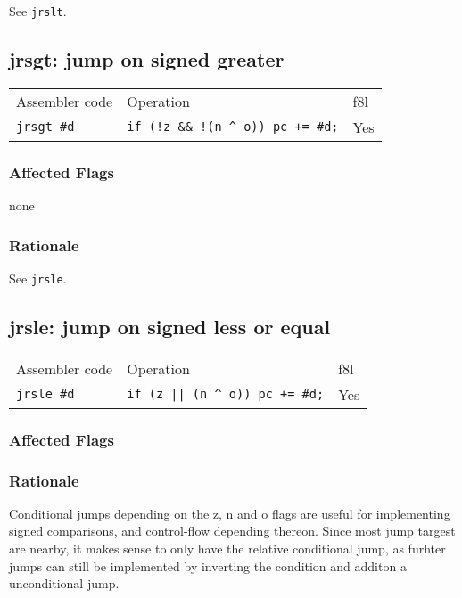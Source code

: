 \documentclass{book}
\begin{document}
See \texttt{jrslt}.


\subsection{jrsgt: jump on signed greater}

\begin{tabular}{l l l}
Assembler code     & Operation                                    & f8l \\
\texttt{jrsgt \#d} & \texttt{if (!z \&\& !(n \^{} o)) pc += \#d;} & Yes \\
\end{tabular}

\subsubsection*{Affected Flags}

none

\subsubsection*{Rationale}

See \texttt{jrsle}.


\subsection{jrsle: jump on signed less or equal}

\begin{tabular}{l l l}
Assembler code   & Operation                                  & f8l \\
\texttt{jrsle \#d} & \texttt{if (z || (n \^{} o)) pc += \#d;} & Yes \\
\end{tabular}

\subsubsection*{Affected Flags}

\subsubsection*{Rationale}

Conditional jumps depending on the z, n and o flags are useful for implementing signed comparisons, and control-flow depending thereon. Since most jump targest are nearby, it makes sense to only have the relative conditional jump, as furhter jumps can still be implemented by inverting the condition and additon a unconditional jump.
\end{document}
